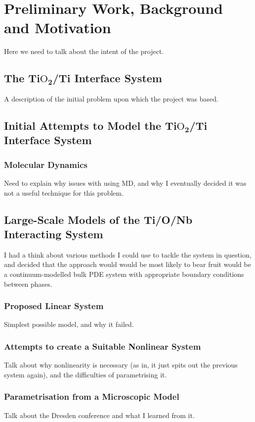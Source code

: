 \chapter{Preliminary Work, Background and Motivation}

Here we need to talk about the intent of the project.

\section{The Ti$\text{O}_\mathbf{2}$/Ti Interface System}

A description of the initial problem upon which the project was based.

\section{Initial Attempts to Model the Ti$\text{O}_\mathbf{2}$/Ti Interface System}
\subsection{Molecular Dynamics}
Need to explain why issues with using MD, and why I eventually decided it was not a useful technique for this problem.

\section{Large-Scale Models of the Ti/O/Nb Interacting System}
I had a think about various methods I could use to tackle the system in question, and decided that the approach would would be most likely to bear fruit would be a continuum-modelled bulk PDE system with appropriate boundary conditions between
phases.
\subsection{Proposed Linear System}
Simplest possible model, and why it failed.
\subsection{Attempts to create a Suitable Nonlinear System}
Talk about why nonlinearity is necessary (as in, it just spits out the previous system again), and the difficulties of parametrising it.
\subsection{Parametrisation from a Microscopic Model}
Talk about the Dresden conference and what I learned from it.

